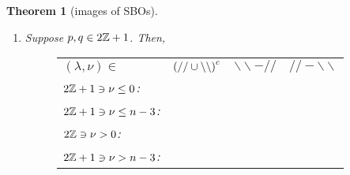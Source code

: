\documentclass[10pt]{article} %
\newtheorem{theorem}{Theorem}
\theoremstyle{definition}
\newcommand{\even}{2\Z}
\newcommand{\odd}{2\Z+1}
\newcommand{\bb}{\backslash\backslash}
\renewcommand{\ss}{//}
\begin{document}
\begin{theorem}[images of SBOs]
\begin{enumerate}
\begin{figure}[H]
\begin{tabular}{m{3cm}ccc}
	      $(\lambda,\nu)\in$&$\left(//\cup\backslash\backslash\right)^c$ & $//-\backslash\backslash$  & $//\cap\backslash\backslash,k< l$\\[15pt]
	      \vspace{-3cm}$\even\ni\nu\ge n-1$:&\\[25pt]
	      \vspace{-3cm}$\odd\ni\nu\ge\frac{n+1}{2}$:&\\[25pt]
	    \end{tabular}
	  \end{figure}
	\item Suppose $p,q\in\odd$. Then,
		\begin{figure}[H]
			\centering
			\begin{tabular}{m{3cm}ccc}
			$(\lambda,\nu)\in$&$\mybra{\ss\cup\bb}^c$ & $\bb-\ss$  & $\ss-\bb$\\[15pt]
			\vspace{-3cm}$\odd\ni\nu\le0$:&\\[15pt]
			\vspace{-3cm}$\odd\ni\nu\le n-3$:&\\[15pt]
			\vspace{-3cm}$\even\ni\nu>0$:&\\[15pt]
			\vspace{-3cm}$\odd\ni\nu>n-3$:&\\[15pt]
			  

\end{tabular}
\end{figure}
\end{enumerate}
\end{theorem}
\end{document}

